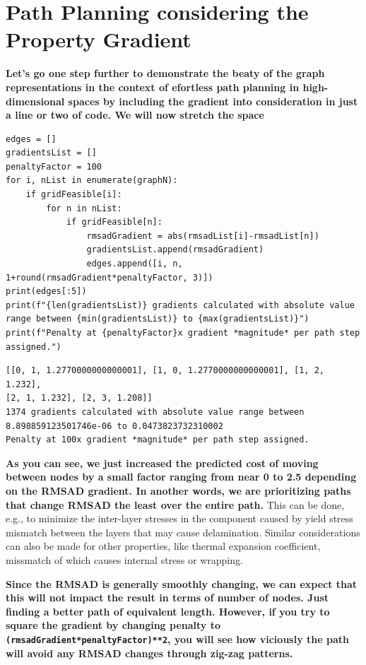 \section{Path Planning considering the Property
Gradient}\label{nimplextutorial2:path-planning-considering-the-property-gradient}

\textbf{Let's go one step further to demonstrate the beaty of the graph
representations in the context of efortless path planning in
high-dimensional spaces by including the gradient into consideration in
just a line or two of code. We will now stretch the space}

\begin{verbatim}
edges = []
gradientsList = []
penaltyFactor = 100
for i, nList in enumerate(graphN):
    if gridFeasible[i]:
        for n in nList:
            if gridFeasible[n]:
                rmsadGradient = abs(rmsadList[i]-rmsadList[n])
                gradientsList.append(rmsadGradient)
                edges.append([i, n, 1+round(rmsadGradient*penaltyFactor, 3)])
print(edges[:5])
print(f"{len(gradientsList)} gradients calculated with absolute value range between {min(gradientsList)} to {max(gradientsList)}")
print(f"Penalty at {penaltyFactor}x gradient *magnitude* per path step assigned.")
\end{verbatim}

\begin{verbatim}
[[0, 1, 1.2770000000000001], [1, 0, 1.2770000000000001], [1, 2, 1.232], 
[2, 1, 1.232], [2, 3, 1.208]]
1374 gradients calculated with absolute value range between 
8.898859123501746e-06 to 0.0473823732310002
Penalty at 100x gradient *magnitude* per path step assigned.
\end{verbatim}

\textbf{As you can see, we just increased the predicted cost of moving
between nodes by a small factor ranging from near 0 to 2.5 depending on
the RMSAD gradient. In another words, we are prioritizing paths that
change RMSAD the least over the entire path.} This can be done, e.g., to
minimize the inter-layer stresses in the component caused by yield
stress mismatch between the layers that may cause delamination. Similar
considerations can also be made for other properties, like thermal
expansion coefficient, missmatch of which causes internal stress or
wrapping.

\textbf{Since the RMSAD is generally smoothly changing, we can expect
that this will not impact the result in terms of number of nodes. Just
finding a better path of equivalent length. However, if you try to
square the gradient by changing penalty to
\texttt{(rmsadGradient*penaltyFactor)**2}, you will see
how viciously the path will avoid any RMSAD changes through zig-zag
patterns.}

